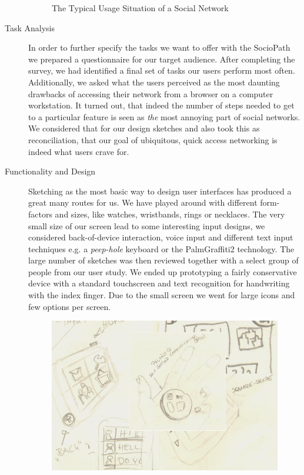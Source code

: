 \begin{description}
\begin{figure}[h]
\begin{center}
  \end{center}
  \caption{The Typical Usage Situation of a Social Network}
  \label{fig:context}
\end{figure}
  \item[Task Analysis]
    In order to further specify the tasks we want to offer with the SocioPath
    we prepared a questionnaire for our target audience. After completing the 
    survey, we had identified a final set of tasks our users perform most often. 
    Additionally, we asked what the users perceived as the most daunting drawbacks
    of accessing their network from a browser on a computer workstation. It turned 
    out, that indeed the number of steps needed to get to a particular feature
    is seen as \emph{the} most annoying part of social networks. We considered 
    that for our design sketches and also took this as reconciliation, that our 
    goal of ubiquitous, quick access networking is indeed what users crave for.
  \item[Functionality and Design]
    Sketching as the most basic way to design user interfaces has produced 
    a great many routes for us. We have played around with different form-factors 
    and sizes, like watches, wristbands, rings or necklaces. The very small 
    size of our screen lead to some interesting input designs, we considered
    back-of-device interaction, voice input and different text input techniques
    e.g. a \emph{peep-hole} keyboard or the Palm\registered Graffiti2\trademark
    technology. The large number of sketches was then reviewed together with a 
    select group of people from our user study. We ended up prototyping a fairly 
    conservative device with a standard touchscreen and text recognition for 
    handwriting with the index finger. Due to the small screen we went for large 
    icons and few options per screen.
\begin{figure}[h]
  \begin{center}
    \includegraphics[width=0.8\linewidth]{imgs/sketches.png}

\end{center}
\end{figure}
\end{description}
